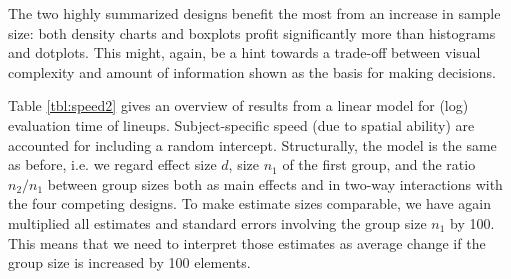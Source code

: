 The two highly summarized designs benefit the most from an increase in sample size: both density charts and boxplots profit significantly more than histograms and dotplots. This might, again, be a hint towards a trade-off between visual complexity and amount of information shown as the basis for making decisions. 


Table \ref{tbl:speed2} gives an overview of results from a linear model for (log) evaluation time of lineups. Subject-specific speed (due to spatial ability) are accounted for  including a random intercept. Structurally, the model is the same as before, i.e. we regard effect size $d$, size $n_1$ of the first group, and the ratio $n_2/n_1$ between group sizes both as main effects and in two-way interactions with the four competing designs. To make estimate sizes comparable, we have again multiplied all estimates and standard errors involving the group size $n_1$ by 100. This means that we need to interpret those  estimates as average change if the group size is increased by 100 elements. 

